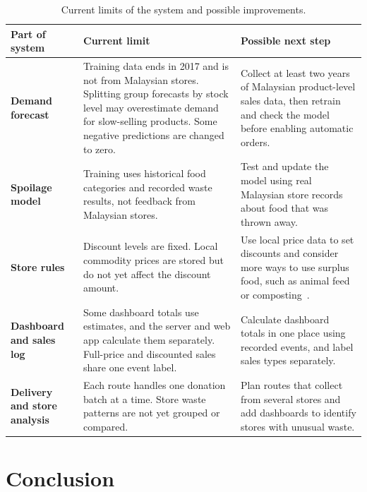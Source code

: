 \documentclass[12pt,a4paper]{article}
\renewcommand{\_}{\oldunderscore\allowbreak}
\begin{document}
\begin{table}[H]
\centering
\caption{Current limits of the system and possible improvements.}
\label{tab:limitations}
\renewcommand{\arraystretch}{1.15}
{\scriptsize
\begin{tabularx}{\textwidth}{@{} >{\bfseries}l >{\raggedright\arraybackslash}X >{\raggedright\arraybackslash}X @{}}
\toprule
\rowcolor{NavyPrimary}
\color{white}\textbf{Part of system} & \color{white}\textbf{Current limit} & \color{white}\textbf{Possible next step} \\
\midrule
Demand forecast & Training data ends in 2017 and is not from Malaysian stores. Splitting group forecasts by stock level may overestimate demand for slow-selling products. Some negative predictions are changed to zero. & Collect at least two years of Malaysian product-level sales data, then retrain and check the model before enabling automatic orders. \\
\rowcolor{LightBg}
Spoilage model & Training uses historical food categories and recorded waste results, not feedback from Malaysian stores. & Test and update the model using real Malaysian store records about food that was thrown away. \\
Store rules & Discount levels are fixed. Local commodity prices are stored but do not yet affect the discount amount. & Use local price data to set discounts and consider more ways to use surplus food, such as animal feed or composting~\cite{refed2026}. \\
\rowcolor{LightBg}
Dashboard and sales log & Some dashboard totals use estimates, and the server and web app calculate them separately. Full-price and discounted sales share one event label. & Calculate dashboard totals in one place using recorded events, and label sales types separately. \\
Delivery and store analysis & Each route handles one donation batch at a time. Store waste patterns are not yet grouped or compared. & Plan routes that collect from several stores and add dashboards to identify stores with unusual waste. \\
\bottomrule
\end{tabularx}}
\end{table}

\section{Conclusion}
\end{document}
